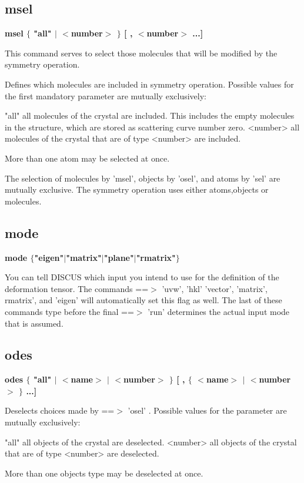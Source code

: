 \subsection*{msel}
{\bf msel $ \{$ "all" $| $ $ <$number$> $ $\} $ [ , $ <$number$> $ ...] \par }
\par
\vspace{3pt}
This command serves to select 
those molecules that will be modified by the symmetry operation. 
\par
Defines which molecules are included in symmetry operation. Possible values 
for the first mandatory parameter are mutually exclusively: 
\par
\begin{MacVerbatim}
"all"     all molecules of the crystal are included.
          This includes the empty molecules in the structure, which are
          stored as scattering curve number zero.
<number>  all molecules of the crystal that are of type <number>
          are included.
\end{MacVerbatim}
More than one atom may be selected at once. 
\par
The selection of molecules by 'msel', objects by 'osel', and atoms 
by 'sel' are mutually 
exclusive. The symmetry operation uses either atoms,objects  or molecules. 
\subsection*{mode}
{\bf mode $ \{$"eigen"$| $"matrix"$| $"plane"$| $"rmatrix"$\} $ \par }
\par
\vspace{3pt}
You can tell DISCUS which input you intend to use for the 
definition of the deformation tensor. The commands ==$> $ 'uvw', 'hkl' 
'vector', 'matrix', rmatrix', and 'eigen' will automatically set 
this flag as well. The last of these commands type before the final 
==$> $ 'run' determines the actual input mode that is assumed. 
\subsection*{odes}
{\bf odes $ \{$ "all" $| $ $ <$name$> $ $| $ $ <$number$> $ $\} $ [ , $ \{$ $ <$name$> $ $| $ $ <$number$> $ $\} $ ...] \par }
\par
\vspace{3pt}
Deselects choices made by ==$> $ 'osel' . Possible values 
for the parameter are mutually exclusively: 
\par
\begin{MacVerbatim}
"all"     all objects of the crystal are deselected.
<number>  all objects of the crystal that are of type <number>
          are deselected.
\end{MacVerbatim}
More than one objects type may be deselected at once. 

